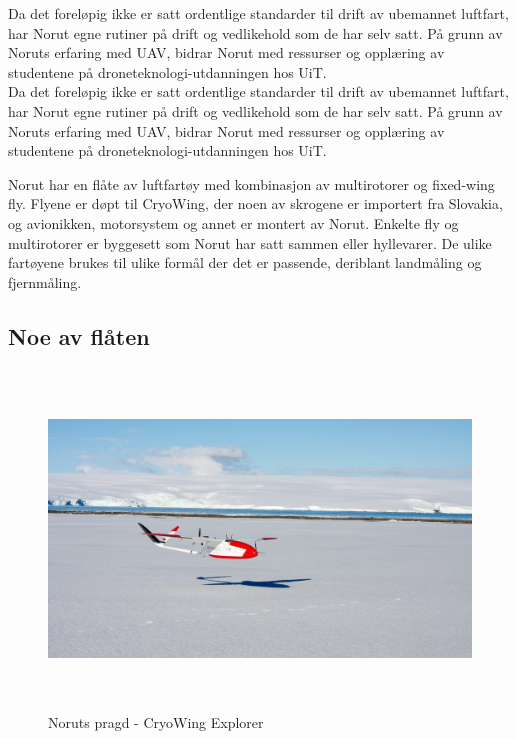 \documentclass[12pt, a4paper]{article}
\begin{document}
Da det foreløpig ikke er satt ordentlige standarder til drift av ubemannet luftfart, har Norut egne rutiner på drift og vedlikehold som de har selv satt. På grunn av Noruts erfaring med UAV, bidrar Norut med ressurser og opplæring av studentene på droneteknologi-utdanningen hos UiT. \\

Da det foreløpig ikke er satt ordentlige standarder til drift av ubemannet luftfart, har Norut egne rutiner på drift og vedlikehold som de har selv satt. På grunn av Noruts erfaring med UAV, bidrar Norut med ressurser og opplæring av studentene på droneteknologi-utdanningen hos UiT. 


Norut har en flåte av luftfartøy med kombinasjon av multirotorer og fixed-wing fly. Flyene er døpt til CryoWing, der noen av skrogene er importert fra Slovakia, og avionikken, motorsystem og annet er montert av Norut. Enkelte fly og multirotorer er byggesett som Norut har satt sammen eller hyllevarer. De ulike fartøyene brukes til ulike formål der det er passende, deriblant landmåling og fjernmåling.\\
\newpage

\subsection{Noe av flåten}
\begin{figure}[hpbt]
	\centering
	\includegraphics[width=.6\textwidth, height=9cm]{bilder/CryoWing_Explorer.jpeg}
	\caption[CryoWing Explorer]{Noruts pragd - CryoWing Explorer}
\end{figure}
\end{document}
